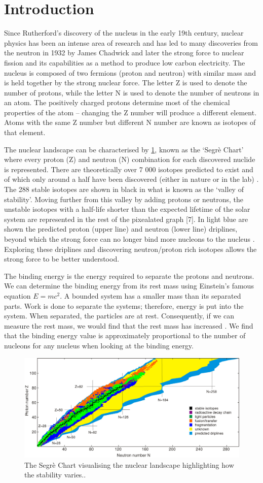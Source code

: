 \section{Introduction}
Since Rutherford’s discovery of the nucleus in the early 19th century,\cite{noauthor_discovery_nodate} nuclear physics has been an intense area of research and has led to many discoveries from the neutron in 1932 by James Chadwick \cite{noauthor_discovery_nodate-1} and later the strong force to nuclear fission and its capabilities as a method to produce low carbon electricity.
The nucleus is composed of two fermions (proton and neutron) with similar mass and is held together by the strong nuclear force.
The letter Z is used to denote the number of protons, while the letter N is used to denote the number of neutrons in an atom. The positively charged protons determine most of the chemical properties of the atom – changing the Z number will produce a different element. Atoms with the same Z number but different N number are known as isotopes of that element.

The nuclear landscape can be characterised by \cref{fig:intronuclan}, known as the ‘Segrè Chart’ where every proton (Z) and neutron (N) combination for each discovered nuclide is represented.
There are theoretically over 7 000 isotopes predicted to exist and of which only around a half have been discovered (either in nature or in the lab) \cite{erler_limits_2012}.
The 288 stable isotopes are shown in black in what is known as the ‘valley of stability’.
Moving further from this valley by adding protons or neutrons, the unstable isotopes with a half-life shorter than the expected lifetime of the solar system are represented in the rest of the pixealated graph [7].
In light blue are shown the predicted proton (upper line) and neutron (lower line) driplines, beyond which the strong force can no longer bind more nucleons to the nucleus \cite{noauthor_amazing_nodate}.
Exploring these driplines and discovering neutron/proton rich isotopes allows the strong force to be better understood.

The binding energy is the energy required to separate the protons and neutrons.
We can determine the binding energy from its rest mass using Einstein’s famous equation $E=mc^2$.
A bounded system has a smaller mass than its separated parts.  Work is done to separate the systems; therefore, energy is put into the system.
When separated, the particles are at rest.
Consequently, if we can measure the rest mass, we would find that the rest mass has increased \cite{noauthor_binding_nodate}.
We find that the binding energy value is approximately proportional to the number of nucleons for any nucleus when looking at the binding energy.

\begin{figure}[H]
    \centering
    \includegraphics[width=.48\textwidth]{images/Intro_nuclearlandscape.jpg}
    \caption{The Segrè Chart visualising the nuclear landscape highlighting how the stability varies.\cite{famiano_nuclear_2019}.}\label{fig:intronuclan}
\end{figure}